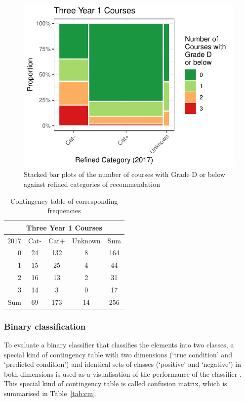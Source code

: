 \documentclass[a4paper]{report}
\begin{document}
\begin{figure}[H]
  \centering
  \includegraphics[width=.7\linewidth]{fig/REL_Y1Fs_vs_NewCat.pdf}
  \caption{\label{fig:REL_Y1Fs_vs_NewCat}Stacked bar plots of the number of courses with Grade D or below against refined categories of recommendation}
\end{figure}

\begin{table}[H]
  \centering
  \begin{tabular}{r|ccc|c}
    \hline
    \multicolumn{5}{c}{\textbf{Three Year 1 Courses}} \\
    \hline
   2017 & Cat- & Cat+ & Unknown & Sum \\ 
    \hline
  0 & 24 & 132 & 8 & 164 \\ 
    1 & 15 & 25 & 4 & 44 \\ 
    2 & 16 & 13 & 2 & 31 \\ 
    3 & 14 & 3 & 0 & 17 \\ 
    \hline
    Sum & 69 & 173 & 14 & 256 \\ 
     \hline
  \end{tabular}
  \caption{\label{tab:REL_Y1Fs_vs_NewCat}Contingency table of corresponding frequencies}
\end{table}

\subsubsection{\label{subsec:cm}Binary classification}

To evaluate a binary classifier that classifies the elements into two classes, a special kind of contingency table with two dimensions (`true condition' and `predicted condition') and identical sets of classes (`positive' and `negative') in both dimensions is used as a visualisation of the performance of the classifier \cite{cm}. This special kind of contingency table is called confusion matrix, which is summarised in Table~\ref{tab:cm}. 
\end{document}
